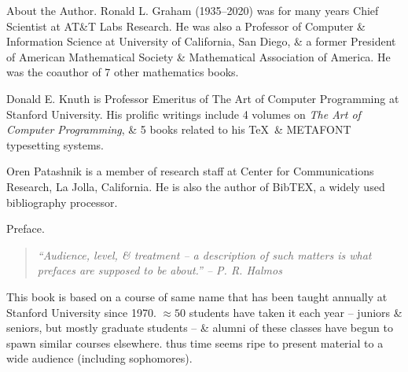 \documentclass{article}
\begin{document}
\begin{enumerate}
	{\sf About the Author.} {\sc Ronald L. Graham} (1935--2020) was for many years Chief Scientist at AT\&T Labs Research. He was also a Professor of Computer \& Information Science at University of California, San Diego, \& a former President of American Mathematical Society \& Mathematical Association of America. He was the coauthor of 7 other mathematics books.
	
	{\sc Donald E. Knuth} is Professor Emeritus of The Art of Computer Programming at Stanford University. His prolific writings include 4 volumes on {\it The Art of Computer Programming}, \& 5 books related to his \TeX\ \& METAFONT typesetting systems.
	
	{\sc Oren Patashnik} is a member of research staff at Center for Communications Research, La Jolla, California. He is also the author of BibTEX, a widely used bibliography processor.
	
	{\sf Preface.}
	\begin{quote}\it
		``Audience, level, \& treatment -- a description of such matters is what prefaces are supposed to be about.'' -- {\sc P. R. Halmos}
	\end{quote}
	This book is based on a course of same name that has been taught annually at Stanford University since 1970. $\approx50$ students have taken it each year -- juniors \& seniors, but mostly graduate students -- \& alumni of these classes have begun to spawn similar courses elsewhere. thus time seems ripe to present material to a wide audience (including sophomores).
	

\end{enumerate}
\end{document}
